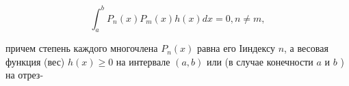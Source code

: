 \documentclass[10pt]{article}
\begin{document}
\[

\int_{a}^{b} P_{n}(x) P_{m}(x) h(x) d x=0, n \neq m,

\]



причем степень каждого многочлена $P_{n}(x)$ равна его Іиндексу $n$, а весовая функция (вес) $h(x) \geqslant 0$ на интервале $(a, b)$ или (в случае конечности $a$ и $b$ ) на отрез-
\end{document}
